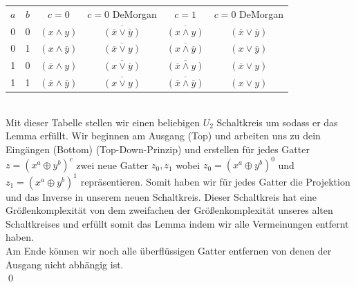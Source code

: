 \documentclass[a4paper]{article}
\begin{document}
\begin{tabular}{|cc|c|c|c|c|}\hline
 $a$    & $b$   & $c = 0$                               & $c = 0$ DeMorgan                              & $c=1$                                                 & $c = 0$ DeMorgan\\
  0     & 0     & $(x \wedge y)$                        & $\overline{(\overline{x} \vee \overline{y})}$ & $\overline{(x \wedge y)}$                             & $(\overline{x} \vee \overline{y})$ \\
  0     & 1     & $(x \wedge \overline{y})$             & $\overline{(\overline{x} \vee y)}$            & $\overline{(x \wedge \overline{y})}$                  & $(x \vee \overline{y})$ \\
  1     & 0     & $(\overline{x} \wedge y)$             & $\overline{(x \vee \overline{y})}$            & $\overline{(\overline{x} \wedge y)}$                  & $(\overline{x} \vee y)$ \\
  1     & 1     & $(\overline{x} \wedge \overline{y})$  & $\overline{(x \vee y)}$                       & $\overline{(\overline{x} \wedge \overline{y})}$       & $(x \vee y)$ \\ \hline
\end{tabular}\\

Mit dieser Tabelle stellen wir einen beliebigen $U_2$ Schaltkreis um sodass er das Lemma erf\"ullt.
Wir beginnen am Ausgang (Top) und arbeiten uns zu dein Eing\"angen (Bottom) (Top-Down-Prinzip) und erstellen f\"ur jedes Gatter $z = (x^a\oplus y^b)^c$ zwei neue Gatter
$z_0, z_1$ wobei $z_0 = (x^a\oplus y^b)^0$ und $z_1 =  (x^a\oplus y^b)^1$ repr\"asentieren. Somit haben wir f\"ur jedes Gatter die Projektion und das Inverse in unserem neuen Schaltkreis.
Dieser Schaltkreis hat eine Gr\"o\ss{}enkomplexit\"at von dem zweifachen der Gr\"o\ss{}enkomplexit\"at unseres alten Schaltkreises und erf\"ullt somit das Lemma indem wir alle Vermeinungen entfernt haben.\\

Am Ende k\"onnen wir noch alle \"uberfl\"ussigen Gatter entfernen von denen der Ausgang nicht abh\"angig ist. \\

\qed{}





\end{document}
